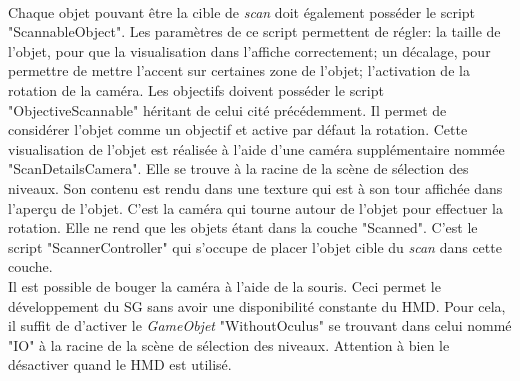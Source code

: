 		\begin{minipage}{\linewidth}
			\label{GuideScan}
		\end{minipage}\medskip%
		\\
		
		Chaque objet pouvant être la cible de \textit{scan} doit également posséder le script "ScannableObject". Les paramètres de ce script permettent de régler: la taille de l'objet, pour que la visualisation dans l'affiche correctement; un décalage, pour permettre de mettre l'accent sur certaines zone de l'objet; l'activation de la rotation de la caméra. Les objectifs doivent posséder le script "ObjectiveScannable" héritant de celui cité précédemment. Il permet de considérer l'objet comme un objectif et active par défaut la rotation. Cette visualisation de l'objet est réalisée à l'aide d'une caméra supplémentaire nommée "ScanDetailsCamera". Elle se trouve à la racine de la scène de sélection des niveaux. Son contenu est rendu dans une texture qui est à son tour affichée dans l'aperçu de l'objet. C'est la caméra qui tourne autour de l'objet pour effectuer la rotation. Elle ne rend que les objets étant dans la couche "Scanned". C'est le script "ScannerController" qui s'occupe de placer l'objet cible du \textit{scan} dans cette couche.
		\\
		
		Il est possible de bouger la caméra à l'aide de la souris. Ceci permet le développement du SG sans avoir une disponibilité constante du HMD. Pour cela, il suffit de d'activer le \textit{GameObjet} "WithoutOculus" se trouvant dans celui nommé "IO" à la racine de la scène de sélection des niveaux. Attention à bien le désactiver quand le HMD est utilisé.
		\\
		
